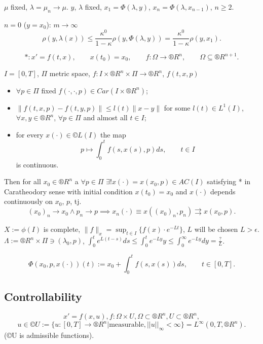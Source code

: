 \documentclass[12pt]{article}					%
\begin{document}
\begin{veta}
\begin{dukazin}
		$\mu$ fixed, $\lambda = \mu_n \rightarrow \mu$. $y$, $\lambda$ fixed, $x_1 = \Phi(\lambda, y)$, $x_n = \Phi(\lambda, x_{n-1})$, $n ≥ 2$.

		$n = 0$ ($y = x_0$): $m \rightarrow ∞$
		$$ \rho(y, \lambda(x)) ≤ \frac{\kappa^0}{1 - \kappa} \rho(y, \Phi(\lambda, y)) = \frac{\kappa^0}{1 - \kappa}\rho(y, x_1). $$
	\end{dukazin}
\end{veta}

\begin{veta}
	$$ *: x' = f(t, x), \qquad x(t_0) = x_0, \qquad f: \Omega \rightarrow ®R^n, \qquad \Omega \subseteq ®R^{n+1}. $$

	$I = [0, T]$, $\Pi$ metric space, $f: I \times ®R^n\times \Pi \rightarrow ®R^n$, $f(t, x, p)$
	\begin{itemize}
		\item $\forall p \in \Pi$ fixed $f(·, ·, p) \in Car(I \times ®R^n)$;
		\item $\|f(t, x, p) - f(t, y, p)\| ≤ l(t)\|x - y\|$ for some $l(t) \in L^1(I)$, $\forall x, y \in ®R^n$, $\forall p \in \Pi$ and almost all $t \in I$;
		\item for every $x(·) \in ©L(I)$ the map
			$$ p \mapsto \int_0^t f(s, x(s), p) ds, \qquad t \in I $$
			is continuous.
	\end{itemize}

	Then for all $x_0 \in ®R^n$ a $\forall p \in \Pi$ $\exists! x( ·) = x(x_0, p) \in AC(I)$ satisfying * in Caratheodory sense with initial condition $x(t_0) = x_0$ and $x(·)$ depends continuously on $x_0$, $p$, tj.
	$$ (x_0)_n \rightarrow x_0 \land p_n \rightarrow p \implies x_n(·) ≡ x((x_0)_n, p_n) \rightrightarrows x(x_0, p). $$

	\begin{dukazin}
		$X := \phi(I)$ is complete, $\|f\|_x = \sup_{t \in I} \{f(x)·e^{-L t}\}$, $L$ will be chosen $L > \epsilon$. $\Lambda := ®R^n \times \Pi \ni (\lambda_0, p)$, $\int_0^t e^{L(t - s)} ds ≤ \int_0^t e^{-L y} y ≤ \int_0^∞ e^{-L y} dy = \frac{?}{L}$.

		$$ \Phi(x_0, p, x(·)) (t) := x_0 + \int_0^t f(s, x(s)) ds, \qquad t \in [0, T]. $$
	\end{dukazin}
\end{veta}


\subsection{Controllability}
\begin{definice}
	$$ x' = f(x, u), f: \Omega \times U, \Omega \subset ®R^n, U \subset ®R^n, $$
	$$ u \in ©U := \{u: [0, T] \rightarrow ®R^n | \text{measurable}, ||u||_∞ < ∞\} = L^∞(0, T, ®R^n). $$
	(©U is admissible functions).
\end{definice}
\end{document}
